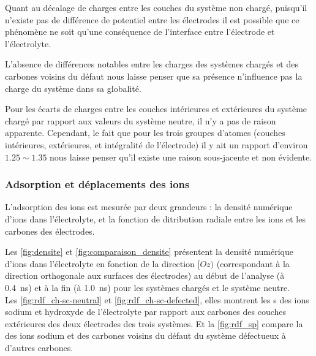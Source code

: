 Quant au décalage de charges entre les couches du système non chargé, puisqu'il n'existe pas de différence de potentiel entre les électrodes il est possible que ce phénomène ne soit qu'une conséquence de l'interface entre l'électrode et l'électrolyte.

L'absence de différences notables entre les charges des systèmes chargés et des carbones voisins du défaut nous laisse penser que sa présence n'influence pas la charge du système dans sa globalité.

Pour les écarts de charges entre les couches intérieures et extérieures du système chargé par rapport aux valeurs du système neutre, il n'y a pas de raison apparente. Cependant, le fait que pour les trois groupes d'atomes (couches intérieures, extérieures, et intégralité de l'électrode) il y ait un rapport d'environ $\num{1.25}\sim \num{1.35}$ nous laisse penser qu'il existe une raison sous-jacente et non évidente.

\clearpage
    \subsubsection{Adsorption et déplacements des ions}

L'adsorption des ions est mesurée par deux grandeurs : la densité numérique d'ions dans l'électrolyte, et la fonction de ditribution radiale entre les ions et les carbones des électrodes.

Les \autoref{fig:densite} et \ref{fig:comparaison_densite} présentent la densité numérique d'ions dans l'électrolyte en fonction de la direction $[Oz)$ (correspondant à la direction orthogonale aux surfaces des électrodes) au début de l'analyse (à \qty{0.4}{\nano \second}) et à la fin (à \qty{1.0}{\nano \second}) pour les systèmes chargés et le système neutre.\\
Les \autoref{fig:rdf_ch-sc-neutral} et \ref{fig:rdf_ch-sc-defected}, elles montrent les \rdf{}s des ions sodium et hydroxyde de l'électrolyte par rapport aux carbones des couches extérieures des deux électrodes des trois systèmes. Et la \autoref{fig:rdf_sp} compare la \rdf{} des ions sodium et des carbones voisins du défaut du système défectueux à d'autres carbones.

